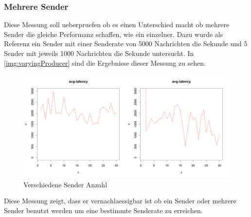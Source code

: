 \subsubsection{Mehrere Sender}
Diese Messung soll ueberpruefen ob es einen Unterschied macht ob mehrere Sender die gleiche Performanz schaffen, wie ein einzelner. Dazu wurde als Referenz ein Sender mit einer Senderate von 5000 Nachrichten die Sekunde und 5 Sender mit jeweils 1000 Nachrichten die Sekunde untersucht. 
In \autoref{img:varyingProducer} sind die Ergebnisse dieser Messung zu sehen. 
\begin{figure}
\center
  \includegraphics[width=1\textwidth]{images/measurement/varying-producer.png}
  \caption{Verschiedene Sender Anzahl}
  \label{img:varyingProducer}
\end{figure}
Diese Messung zeigt, dass er vernachlaessigbar ist ob ein Sender oder mehrere Sender benutzt werden um eine bestimmte Senderate zu erreichen. 



